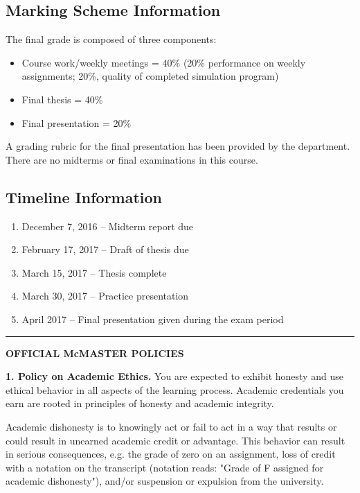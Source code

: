 \documentclass[10pt,oneside]{amsart}
\begin{document}
\subsection*{Marking Scheme Information}
The final grade is composed of three components:
\begin{itemize}
\item Course work/weekly meetings = 40\% (20\% performance on weekly assignments; 20\%, quality of completed simulation program)
\item Final thesis = 40\%
\item Final presentation = 20\%
\end{itemize}

\noindent
A grading rubric for the final presentation has been provided by the 
department.  There are no midterms or final examinations in this course.

\noindent
\subsection*{Timeline Information}

\begin{enumerate}
\item[] December 7, 2016 -- Midterm report due
\item[] February 17, 2017 -- Draft of thesis due
\item[] March 15, 2017 -- Thesis complete
\item[] March 30, 2017 -- Practice presentation
\item[] April 2017 -- Final presentation given during the exam period
\end{enumerate}
\vspace{.25cm}


\hrule
\vspace{.25cm}

\footnotesize
\noindent
{\bf OFFICIAL McMASTER POLICIES}
\vspace{.25cm}

\noindent
{\bf 1. Policy on Academic Ethics.}
You are expected to exhibit honesty and use ethical behavior in all 
aspects of the learning process. Academic credentials you earn are 
rooted in principles of honesty and academic integrity.
\vspace{.25cm}

\noindent
Academic dishonesty is to knowingly act or fail to act in a way that 
results or could result in unearned academic credit or advantage. This 
behavior can result in serious consequences, e.g. the grade of zero on 
an assignment, loss of credit with a notation on the transcript 
(notation reads: "Grade of F assigned for academic dishonesty"), 
and/or suspension or expulsion from the university.
\vspace{.25cm}
\end{document}
